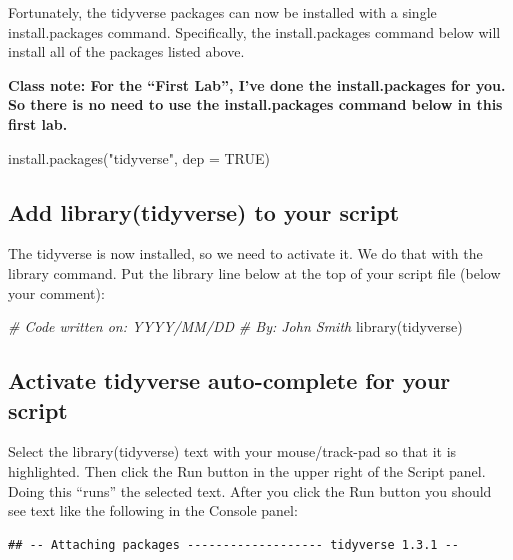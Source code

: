 \documentclass[
]{krantz}
\makeatletter
\newenvironment{Shaded}{\begin{snugshade}}{\end{snugshade}}
\newcommand{\AttributeTok}[1]{\textcolor[rgb]{0.61,0.61,0.61}{#1}}
\newcommand{\CommentTok}[1]{\textcolor[rgb]{0.37,0.37,0.37}{\textit{#1}}}
\newcommand{\ConstantTok}[1]{\textcolor[rgb]{0,0,0}{#1}}
\newcommand{\FunctionTok}[1]{\textcolor[rgb]{0,0,0}{#1}}
\newcommand{\NormalTok}[1]{#1}
\newcommand{\StringTok}[1]{\textcolor[rgb]{0.5,0.5,0.5}{#1}}
\newenvironment{kframe}{%
\medskip{}
\setlength{\fboxsep}{.8em}
 \def\at@end@of@kframe{}%
 \ifinner\ifhmode%
  \def\at@end@of@kframe{\end{minipage}}%
  \begin{minipage}{\columnwidth}%
 \fi\fi%
 \def\FrameCommand##1{\hskip\@totalleftmargin \hskip-\fboxsep
 \colorbox{shadecolor}{##1}\hskip-\fboxsep
     \hskip-\linewidth \hskip-\@totalleftmargin \hskip\columnwidth}%
 \MakeFramed {\advance\hsize-\width
   \@totalleftmargin\z@ \linewidth\hsize
   \@setminipage}}%
 {\par\unskip\endMakeFramed%
 \at@end@of@kframe}
\renewenvironment{Shaded}{\begin{kframe}}{\end{kframe}}
\makeatother
\begin{document}
Fortunately, the tidyverse packages can now be installed with a single install.packages command. Specifically, the install.packages command below will install all of the packages listed above.

\textbf{Class note: For the ``First Lab'', I've done the install.packages for you. So there is no need to use the install.packages command below in this first lab.}

\begin{Shaded}
\begin{Highlighting}[]
\FunctionTok{install.packages}\NormalTok{(}\StringTok{"tidyverse"}\NormalTok{, }\AttributeTok{dep =} \ConstantTok{TRUE}\NormalTok{)}
\end{Highlighting}
\end{Shaded}

\hypertarget{add-librarytidyverse-to-your-script}{%
\subsection{Add library(tidyverse) to your script}\label{add-librarytidyverse-to-your-script}}

The tidyverse is now installed, so we need to activate it. We do that with the library command. Put the library line below at the top of your script file (below your comment):

\begin{Shaded}
\begin{Highlighting}[]
\CommentTok{\# Code written on: YYYY/MM/DD }
\CommentTok{\# By: John Smith}
\FunctionTok{library}\NormalTok{(tidyverse)}
\end{Highlighting}
\end{Shaded}

\hypertarget{activate-tidyverse-auto-complete-for-your-script}{%
\subsection{Activate tidyverse auto-complete for your script}\label{activate-tidyverse-auto-complete-for-your-script}}

Select the library(tidyverse) text with your mouse/track-pad so that it is highlighted. Then click the Run button in the upper right of the Script panel. Doing this ``runs'' the selected text. After you click the Run button you should see text like the following in the Console panel:

\begin{verbatim}
## -- Attaching packages ------------------- tidyverse 1.3.1 --
\end{verbatim}
\end{document}

